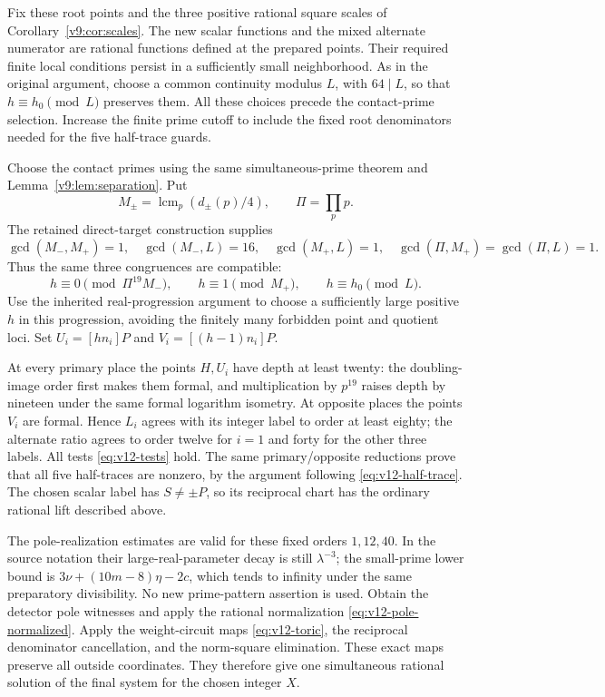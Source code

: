 Fix these root points and the three positive rational square scales
of Corollary~\ref{v9:cor:scales}.  The new scalar functions and the
mixed alternate numerator are rational functions defined at the
prepared points.  Their required finite local conditions persist in
a sufficiently small neighborhood.  As in the original argument,
choose a common continuity modulus $L$, with $64\mid L$, so that
$h\equiv h_0\pmod L$ preserves them.  All these choices precede the
contact-prime selection.  Increase the finite prime cutoff to include
the fixed root denominators needed for the five half-trace guards.

Choose the contact primes using the same simultaneous-prime theorem
and Lemma~\ref{v9:lem:separation}.  Put
\[
 M_\pm=\operatorname{lcm}_p(d_\pm(p)/4),\qquad\Pi=\prod_p p.
\]
The retained direct-target construction supplies
\[
 \gcd(M_-,M_+)=1,\quad\gcd(M_-,L)=16,\quad\gcd(M_+,L)=1,
 \quad\gcd(\Pi,M_+)=\gcd(\Pi,L)=1.
\]
Thus the same three congruences are compatible:
\[
 h\equiv0\pmod{\Pi^{19}M_-},\qquad
 h\equiv1\pmod{M_+},\qquad h\equiv h_0\pmod L.
\]
Use the inherited real-progression argument to choose a sufficiently
large positive $h$ in this progression, avoiding the finitely many
forbidden point and quotient loci.  Set
$U_i=[hn_i]P$ and $V_i=[(h-1)n_i]P$.

At every primary place the points $H,U_i$ have depth at least twenty:
the doubling-image order first makes them formal, and multiplication
by $p^{19}$ raises depth by nineteen under the same formal logarithm
isometry.  At opposite places the points $V_i$ are formal.  Hence
$L_i$ agrees with its integer label to order at least eighty; the
alternate ratio agrees to order twelve for $i=1$ and forty for the
other three labels.  All tests \eqref{eq:v12-tests} hold.  The same
primary/opposite reductions prove that all five half-traces are
nonzero, by the argument following \eqref{eq:v12-half-trace}.
The chosen scalar label has $S\ne\pm P$, so its reciprocal chart
has the ordinary rational lift described above.

The pole-realization estimates are valid for these fixed orders
$1,12,40$.  In the source notation their large-real-parameter decay
is still $\lambda^{-3}$; the small-prime lower bound is
$3\nu+(10m-8)\eta-2c$, which tends to infinity under the same
preparatory divisibility.  No new prime-pattern assertion is used.
Obtain the detector pole witnesses and apply the rational
normalization \eqref{eq:v12-pole-normalized}.  Apply the weight-circuit
maps \eqref{eq:v12-toric}, the reciprocal denominator cancellation,
and the norm-square elimination.  These exact maps preserve all
outside coordinates.  They therefore give one simultaneous rational
solution of the final system for the chosen integer $X$.

